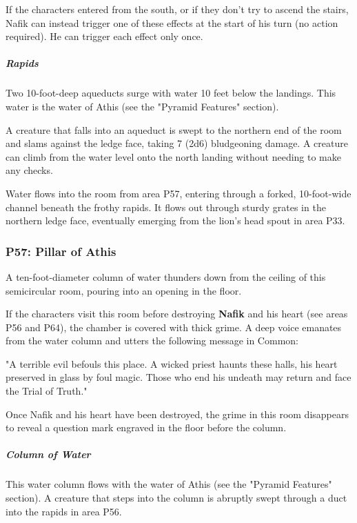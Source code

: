\documentclass[10pt,a4paper,twoside,bg=print,twocolumn,openany,nodeprecatedcode]{dndbook}
\begin{document}
If the characters entered from the south, or if they don't try to ascend the stairs, Nafik can instead trigger one of these effects at the start of his turn (no action required). He can trigger each effect only once.

\subparagraph{Rapids}
Two 10-foot-deep aqueducts surge with water 10 feet below the landings. This water is the water of Athis (see the "Pyramid Features" section).

A creature that falls into an aqueduct is swept to the northern end of the room and slams against the ledge face, taking 7 (2d6) bludgeoning damage. A creature can climb from the water level onto the north landing without needing to make any checks.

Water flows into the room from area P57, entering through a forked, 10-foot-wide channel beneath the frothy rapids. It flows out through sturdy grates in the northern ledge face, eventually emerging from the lion's head spout in area P33.

\subsubsection{P57: Pillar of Athis}
\begin{DndReadAloud}{}
A ten-foot-diameter column of water thunders down from the ceiling of this semicircular room, pouring into an opening in the floor.

\end{DndReadAloud}

If the characters visit this room before destroying \textbf{Nafik} and his heart (see areas P56 and P64), the chamber is covered with thick grime. A deep voice emanates from the water column and utters the following message in Common:

\begin{DndReadAloud}{}
"A terrible evil befouls this place. A wicked priest haunts these halls, his heart preserved in glass by foul magic. Those who end his undeath may return and face the Trial of Truth."

\end{DndReadAloud}

Once Nafik and his heart have been destroyed, the grime in this room disappears to reveal a question mark engraved in the floor before the column.

\subparagraph{Column of Water}
This water column flows with the water of Athis (see the "Pyramid Features" section). A creature that steps into the column is abruptly swept through a duct into the rapids in area P56.
\end{document}
